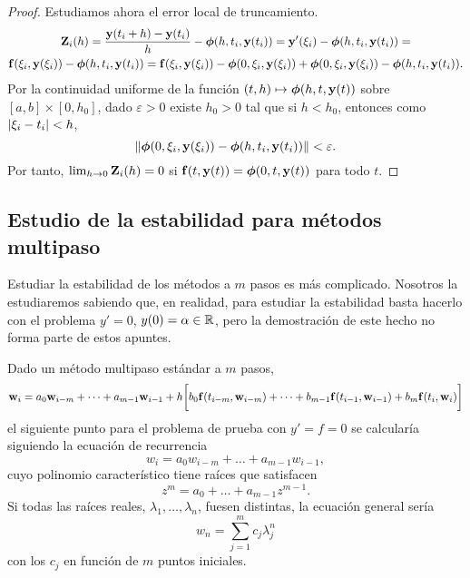\begin{proof}
    Estudiamos ahora el error local de truncamiento.
    \begin{multline*}
        \vb{Z}{}_i(h) = \frac{\vb{y}{}(t_i + h) - \vb{y}{}(t_i)}{h} - \vb*{\phi}{}(h, t_i, \vb{y}{}(t_i)) =
        \vb{y}{}'(\xi_i) - \vb*{\phi}{}(h, t_i, \vb{y}{}(t_i)) = \\
        \vb{f}{}(\xi_i, \vb{y}{}(\xi_i)) - \vb*{\phi}{}(h, t_i, \vb{y}{}(t_i)) =
        \vb{f}{}(\xi_i, \vb{y}{}(\xi_i)) - \vb*{\phi}{}(0, \xi_i, \vb{y}{}(\xi_i))
            + \vb*{\phi}{}(0, \xi_i, \vb{y}{}(\xi_i)) - \vb*{\phi}{}(h, t_i, \vb{y}{}(t_i)).
    \end{multline*}
    Por la continuidad uniforme de la función
    $(t, h) \mapsto \vb*{\phi}{}(h, t, \vb{y}{}(t))$ sobre $[a, b] \times [0, h_0]$,
    dado $\varepsilon > 0$ existe $h_0 > 0$ tal que si $h < h_0$,
    entonces como $\abs{\xi_i - t_i} < h$,
    \begin{equation*}
        \norm{\vb*{\phi}{}(0, \xi_i, \vb{y}{}(\xi_i)) - \vb*{\phi}{}(h, t_i, \vb{y}{}(t_i))} <
        \varepsilon.
    \end{equation*}
    Por tanto, $\lim_{h \to 0} \vb{Z}{}_i(h) = 0$
    si $\vb{f}{}(t, \vb{y}{}(t)) = \vb*{\phi}{}(0, t, \vb{y}{}(t))$ para todo $t$.
\end{proof}

\subsection{Estudio de la estabilidad para métodos multipaso}

Estudiar la estabilidad de los métodos a $m$ pasos es más complicado.
Nosotros la estudiaremos sabiendo que, en realidad,
para estudiar la estabilidad basta hacerlo con el problema
$y' = 0$, $y(0) = \alpha \in \mathbb{R}$,
pero la demostración de este hecho no forma parte de estos apuntes.

Dado un método multipaso estándar a $m$ pasos,
\begin{equation*}
    \vb{w}{}_i = a_0\vb{w}{}_{i-m} + \dots + a_{m-1}\vb{w}{}_{i-1} + h\qty\bigg[
        b_0\vb{f}{}(t_{i-m}, \vb{w}{}_{i-m}) + \dots + b_{m-1}\vb{f}{}(t_{i-1}, \vb{w}{}_{i-1})
        + b_m\vb{f}{}(t_i, \vb{w}{}_i)
    ]
\end{equation*}
el siguiente punto para el problema de prueba con $y' = f = 0$ se calcularía
siguiendo la ecuación de recurrencia
\begin{equation*}
    w_i = a_0w_{i-m} + \dots + a_{m-1}w_{i-1},
\end{equation*}
cuyo polinomio característico tiene raíces que satisfacen
\begin{equation*}
    z^m = a_0 + \dots + a_{m-1}z^{m-1}.
\end{equation*}
Si todas las raíces reales, $\lambda_1,\dots,\lambda_n$, fuesen distintas,
la ecuación general sería
\begin{equation*}
    w_n = \sum_{j=1}^m c_j\lambda_j^n
\end{equation*}
con los $c_j$ en función de $m$ puntos iniciales.

